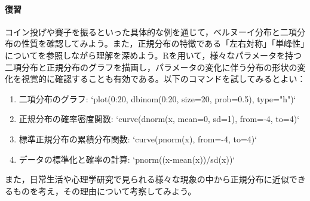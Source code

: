 \paragraph{復習}
コイン投げや賽子を振るといった具体的な例を通じて，ベルヌーイ分布と二項分布の性質を確認してみよう。また，正規分布の特徴である「左右対称」「単峰性」について\textcite{Naganuma2201611}を参照しながら理解を深めよう。Rを用いて，様々なパラメータを持つ二項分布と正規分布のグラフを描画し，パラメータの変化に伴う分布の形状の変化を視覚的に確認することも有効である。以下のコマンドを試してみるとよい：

\begin{enumerate}
\item 二項分布のグラフ: `plot(0:20, dbinom(0:20, size=20, prob=0.5), type="h")`
\item 正規分布の確率密度関数: `curve(dnorm(x, mean=0, sd=1), from=-4, to=4)`
\item 標準正規分布の累積分布関数: `curve(pnorm(x), from=-4, to=4)`
\item データの標準化と確率の計算: `pnorm((x-mean(x))/sd(x))`
\end{enumerate}

また，日常生活や心理学研究で見られる様々な現象の中から正規分布に近似できるものを考え，その理由について考察してみよう。